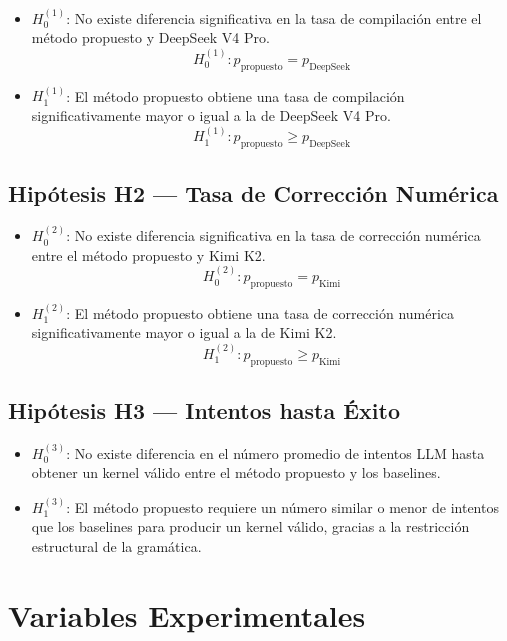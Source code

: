 \documentclass[12pt]{article}
\begin{document}
\begin{itemize}
  \item $H_0^{(1)}$: No existe diferencia significativa en la tasa de compilación
    entre el método propuesto y DeepSeek V4 Pro.
    \[H_0^{(1)}: p_{\text{propuesto}} = p_{\text{DeepSeek}}\]

  \item $H_1^{(1)}$: El método propuesto obtiene una tasa de compilación
    significativamente mayor o igual a la de DeepSeek V4 Pro.
    \[H_1^{(1)}: p_{\text{propuesto}} \geq p_{\text{DeepSeek}}\]
\end{itemize}

\subsection{Hipótesis H2 — Tasa de Corrección Numérica}

\begin{itemize}
  \item $H_0^{(2)}$: No existe diferencia significativa en la tasa de corrección
    numérica entre el método propuesto y Kimi K2.
    \[H_0^{(2)}: p_{\text{propuesto}} = p_{\text{Kimi}}\]

  \item $H_1^{(2)}$: El método propuesto obtiene una tasa de corrección numérica
    significativamente mayor o igual a la de Kimi K2.
    \[H_1^{(2)}: p_{\text{propuesto}} \geq p_{\text{Kimi}}\]
\end{itemize}

\subsection{Hipótesis H3 — Intentos hasta Éxito}

\begin{itemize}
  \item $H_0^{(3)}$: No existe diferencia en el número promedio de intentos LLM
    hasta obtener un kernel válido entre el método propuesto y los baselines.

  \item $H_1^{(3)}$: El método propuesto requiere un número similar o menor de
    intentos que los baselines para producir un kernel válido, gracias a la
    restricción estructural de la gramática.
\end{itemize}

\section{Variables Experimentales}
\end{document}
